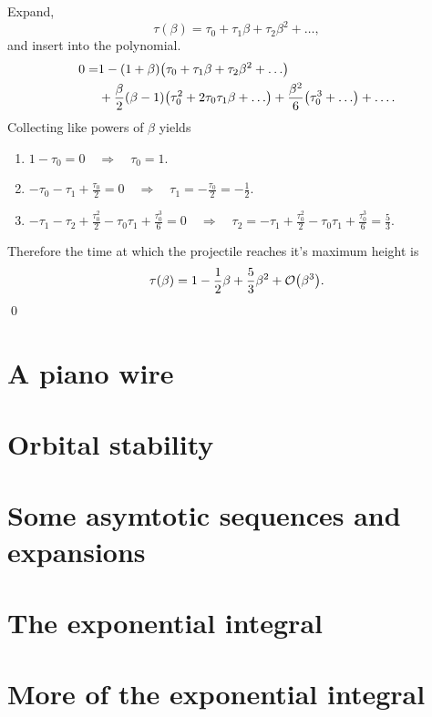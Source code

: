 \documentclass[11pt,letter, swedish, english
]{article}
\begin{document}
Expand,
\begin{equation}
\tau(\beta) = \tau_0 + \tau_1\beta + \tau_2\beta^2 +\ldots,
\end{equation}
and insert into the polynomial. 
\begin{equation}
\begin{aligned}
0=&1 - (1+\beta)\qty(\tau_0+\tau_1\beta + \tau_2\beta^2+\ldots)\\
&+ \frac{\beta}{2}\qty(\beta -1)\qty(\tau_0^2+2\tau_0\tau_1\beta+\ldots)
+\frac{\beta^2}{6}\qty(\tau_0^3+\ldots) + \ldots.
\end{aligned}
\end{equation}
Collecting like powers of $\beta$
yields
\begin{enumerate}[label=$\order{\beta^{\arabic*}}$: , start=0, leftmargin=2cm]
\item $\displaystyle 1-\tau_0 = 0 \quad\Longrightarrow\quad
\tau_0=1$.
\item $\displaystyle -\tau_0-\tau_1+\frac{\tau_0}{2} = 0 \quad\Longrightarrow\quad
\tau_1= -\frac{\tau_0}{2} = -\frac{1}{2}$.
\item $\displaystyle -\tau_1-\tau_2+\frac{\tau_0^2}{2}-\tau_0\tau_1 +\frac{\tau_0^3}{6}= 0 \quad\Longrightarrow\quad
\tau_2=-\tau_1+\frac{\tau_0^2}{2}-\tau_0\tau_1 +\frac{\tau_0^3}{6} = \frac{5}{3}$.
\end{enumerate}
Therefore the time at which the projectile reaches it's maximum height
is 
\begin{equation}
\tau(\beta) = 1 - \frac{1}{2}\beta + \frac{5}{3}\beta^2 + \order{\beta^3}.
\end{equation}
\qed


\section{A piano wire}


\section{Orbital stability }


\section{Some asymtotic sequences and expansions}


\section{The exponential integral}


\section{More of the exponential integral}
\end{document}
